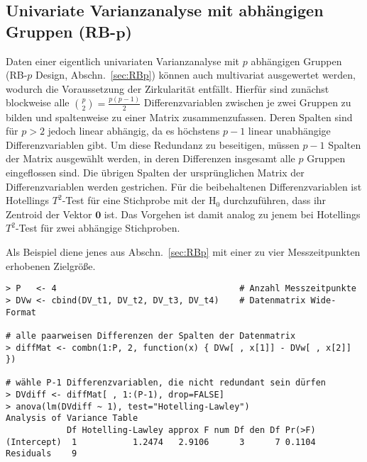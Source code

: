 \subsection[Univariate Varianzanalyse mit abhängigen Gruppen (RB-\texorpdfstring{$p$}{p})]{Univariate Varianzanalyse mit abhängigen Gruppen (RB-$\bm{p}$)}
\label{sec:multRBp}

Daten einer eigentlich univariaten Varianzanalyse mit $p$ abhängigen Gruppen (RB-$p$ Design, Abschn.\ \ref{sec:RBp}) können auch multivariat ausgewertet werden, wodurch die Voraussetzung der Zirkularität entfällt. Hierfür sind zunächst blockweise alle ${p \choose 2} = \frac{p (p-1)}{2}$ Differenzvariablen zwischen je zwei Gruppen zu bilden und spaltenweise zu einer Matrix zusammenzufassen. Deren Spalten sind für $p > 2$ jedoch linear abhängig, da es höchstens $p-1$ linear unabhängige Differenzvariablen gibt. Um diese Redundanz zu beseitigen, müssen $p-1$ Spalten der Matrix ausgewählt werden, in deren Differenzen insgesamt alle $p$ Gruppen eingeflossen sind. Die übrigen Spalten der ursprünglichen Matrix der Differenzvariablen werden gestrichen. Für die beibehaltenen Differenzvariablen ist Hotellings $T^{2}$-Test für eine Stichprobe mit der $\text{H}_{0}$ durchzuführen, dass ihr Zentroid der Vektor $\bm{0}$ ist. Das Vorgehen ist damit analog zu jenem bei Hotellings $T^{2}$-Test für zwei abhängige Stichproben.

Als Beispiel diene jenes aus Abschn.\ \ref{sec:RBp} mit einer zu vier Messzeitpunkten erhobenen Zielgröße.
\begin{lstlisting}
> P   <- 4                                    # Anzahl Messzeitpunkte
> DVw <- cbind(DV_t1, DV_t2, DV_t3, DV_t4)    # Datenmatrix Wide-Format

# alle paarweisen Differenzen der Spalten der Datenmatrix
> diffMat <- combn(1:P, 2, function(x) { DVw[ , x[1]] - DVw[ , x[2]] })

# wähle P-1 Differenzvariablen, die nicht redundant sein dürfen
> DVdiff <- diffMat[ , 1:(P-1), drop=FALSE]
> anova(lm(DVdiff ~ 1), test="Hotelling-Lawley")
Analysis of Variance Table
            Df Hotelling-Lawley approx F num Df den Df Pr(>F)
(Intercept)  1           1.2474   2.9106      3      7 0.1104
Residuals    9
\end{lstlisting}

